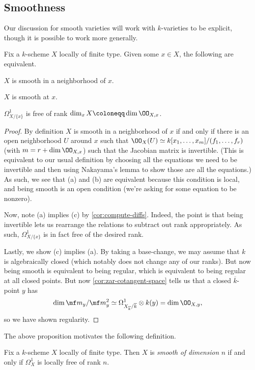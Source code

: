 \documentclass[../notes.tex]{subfiles}
\begin{document}
\subsection{Smoothness}
Our discussion for smooth varieties will work with $k$-varieties to be explicit, though it is possible to work more generally.
\begin{proposition}
	Fix a $k$-scheme $X$ locally of finite type. Given some $x\in X$, the following are equivalent.
	\begin{listalph}
		\item $X$ is smooth in a neighborhood of $x$.
		\item $X$ is smooth at $x$.
		\item $\Omega^1_{X/\{x\}}$ is free of rank $\dim_xX\coloneqq\dim\OO_{X,x}$.
	\end{listalph}
\end{proposition}
\begin{proof}
	By definition $X$ is smooth in a neighborhood of $x$ if and only if there is an open neighborhood $U$ around $x$ such that $\OO_X(U)\simeq k[x_1,\ldots,x_m]/(f_1,\ldots,f_r)$ (with $m=r+\dim\OO_{X,x}$) such that the Jacobian matrix is invertible. (This is equivalent to our usual definition by choosing all the equations we need to be invertible and then using Nakayama's lemma to show those are all the equations.) As such, we see that (a) and (b) are equivalent because this condition is local, and being smooth is an open condition (we're asking for some equation to be nonzero).

	Now, note (a) implies (c) by \autoref{cor:compute-diffs}. Indeed, the point is that being invertible lets us rearrange the relations to subtract out rank appropriately. As such, $\Omega^1_{X/\{x\}}$ is in fact free of the desired rank.

	Lastly, we show (c) implies (a). By taking a base-change, we may assume that $k$ is algebraically closed (which notably does not change any of our ranks). But now being smooth is equivalent to being regular, which is equivalent to being regular at all closed points. But now \autoref{cor:zar-cotangent-space} tells us that a closed $\overline k$-point $y$ has
	\[\dim\mf m_y/\mf m_y^2\simeq\Omega^1_{X_{\overline k}/\overline k}\otimes k(y)=\dim\OO_{X,y},\]
	so we have shown regularity.
\end{proof}
The above proposition motivates the following definition.
\begin{definition}[Smooth]
	Fix a $k$-scheme $X$ locally of finite type. Then $X$ is \textit{smooth of dimension $n$} if and only if $\Omega^1_X$ is locally free of rank $n$.
\end{definition}
\end{document}
